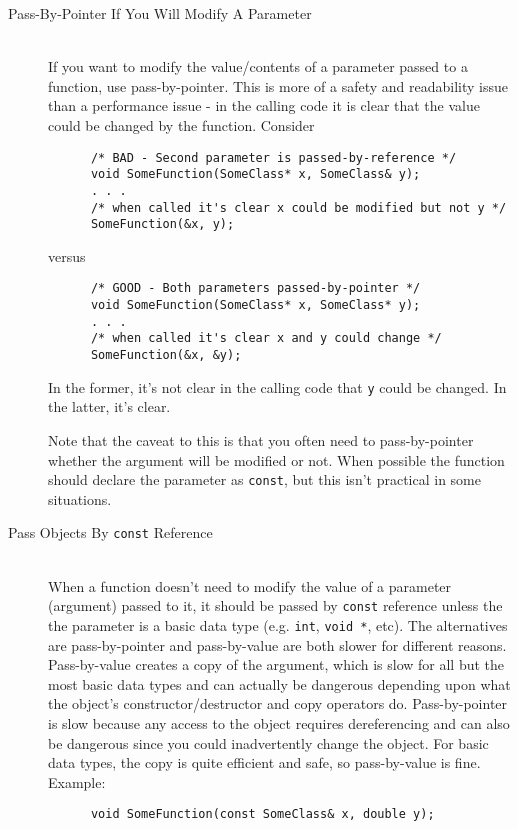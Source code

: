 \documentclass[11pt]{article}
\begin{document}
\begin{description}

  \item[Pass-By-Pointer If You Will Modify A Parameter]\hfill \\
    If you want to modify the value/contents of a parameter passed to a function, use pass-by-pointer.  This is more of a safety and readability issue than a performance issue - in the calling code it is clear that the value could be changed by the function.  Consider
    \begin{lstlisting}
      /* BAD - Second parameter is passed-by-reference */
      void SomeFunction(SomeClass* x, SomeClass& y);
      . . .
      /* when called it's clear x could be modified but not y */
      SomeFunction(&x, y);
    \end{lstlisting}
    versus
    \begin{lstlisting}
      /* GOOD - Both parameters passed-by-pointer */
      void SomeFunction(SomeClass* x, SomeClass* y);
      . . .
      /* when called it's clear x and y could change */
      SomeFunction(&x, &y);
    \end{lstlisting}
    In the former, it's not clear in the calling code that {\tt y} could be changed.  In the latter, it's clear.

    Note that the caveat to this is that you often need to pass-by-pointer whether the argument will be modified or not.  When possible the function should declare the parameter as {\tt const}, but this isn't practical in some situations.

  \item[Pass Objects By {\tt const} Reference] \hfill \\
    When a function doesn't need to modify the value of a parameter (argument) passed to it, it should be passed by {\tt const} reference unless the the parameter is a basic data type (e.g. {\tt int}, {\tt void *}, etc).  The alternatives are pass-by-pointer and pass-by-value are both slower for different reasons.  Pass-by-value creates a copy of the argument, which is slow for all but the most basic data types and can actually be dangerous depending upon what the object's constructor/destructor and copy operators do.  Pass-by-pointer is slow because any access to the object requires dereferencing and can also be dangerous since you could inadvertently change the object.  For basic data types, the copy is quite efficient and safe, so pass-by-value is fine.  Example:
    \begin{lstlisting}
      void SomeFunction(const SomeClass& x, double y);
    \end{lstlisting}



\end{description}
\end{document}
